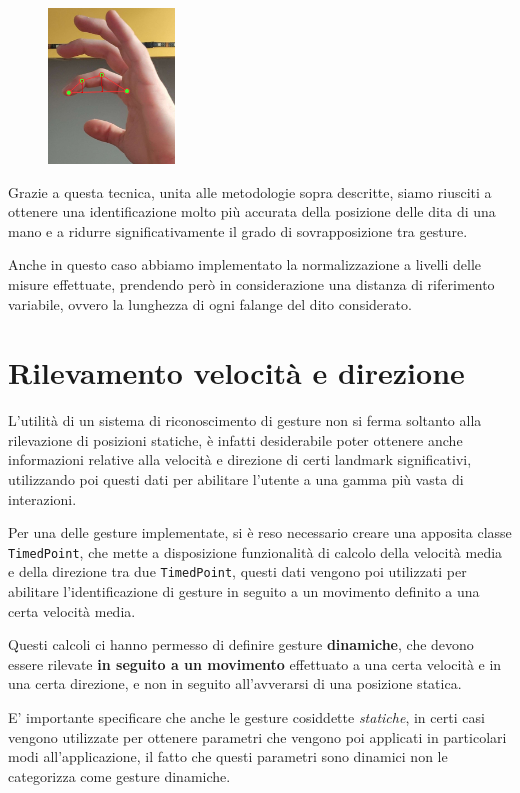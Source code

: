 \begin{figure}[H]
    \centering
    \includegraphics[width=0.3\textwidth]{images/mano_vettore.png}
\end{figure}

Grazie a questa tecnica, unita alle metodologie sopra descritte, siamo riusciti a ottenere una identificazione molto più accurata della posizione delle dita di una mano e a ridurre significativamente il grado di sovrapposizione tra gesture.

Anche in questo caso abbiamo implementato la normalizzazione a livelli delle misure effettuate, prendendo però in considerazione una distanza di riferimento variabile, ovvero la lunghezza di ogni falange del dito considerato.

\section{Rilevamento velocità e direzione}

L'utilità di un sistema di riconoscimento di gesture non si ferma soltanto alla rilevazione di posizioni statiche, è infatti desiderabile poter ottenere anche informazioni relative alla velocità e direzione di certi landmark significativi, utilizzando poi questi dati per abilitare l'utente a una gamma più vasta di interazioni.

Per una delle gesture implementate, si è reso necessario creare una apposita classe \texttt{TimedPoint}, che mette a disposizione funzionalità di calcolo della velocità media e della direzione tra due \texttt{TimedPoint}, questi dati vengono poi utilizzati per abilitare l'identificazione di gesture in seguito a un movimento definito a una certa velocità media.

Questi calcoli ci hanno permesso di definire gesture \textbf{dinamiche}, che devono essere rilevate \textbf{in seguito a un movimento} effettuato a una certa velocità e in una certa direzione, e non in seguito all'avverarsi di una posizione statica.

E' importante specificare che anche le gesture cosiddette \textit{statiche}, in certi casi vengono utilizzate per ottenere parametri che vengono poi applicati in particolari modi all'applicazione, il fatto che questi parametri sono dinamici non le categorizza come gesture dinamiche. 


